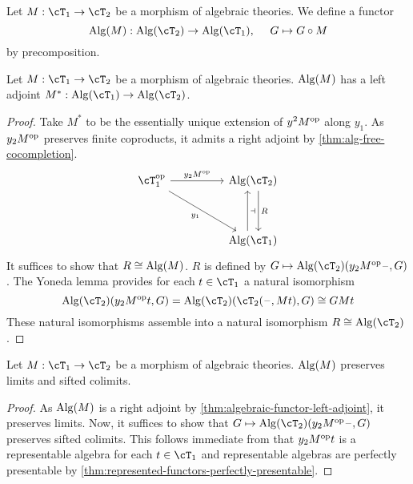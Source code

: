 \documentclass{zett}
\begin{document}
\begin{defn}
  Let $M : \cT_{1} \to \cT_{2}$ be a morphism of algebraic theories.
  We define a functor
  \[
    \Alg(M) : \Alg(\cT_{2}) \to \Alg(\cT_{1}),\quad~G \mapsto G \circ M
  \]
  by precomposition.
\end{defn}

\begin{thm}\label{thm:algebraic-functor-left-adjoint}
  Let $M : \cT_{1} \to \cT_{2}$ be a morphism of algebraic theories.
  $\operatorname{Alg}(M)$ has a left adjoint $M^{*} : \Alg(\cT_{1}) \to \Alg(\cT_{2})$.
\end{thm}
\begin{proof}
  Take $M^{*}$ to be the essentially unique extension of $y^{2}M^{\mathrm{op}}$ along $y_{1}$.
  As $y_{2}M^{\mathrm{op}}$ preserves finite coproducts, it admits a right adjoint by \cref{thm:alg-free-cocompletion}.
  \[\begin{tikzcd}
      {\cT_{1}\op} && {\Alg(\cT_{2})} \\
      \\
      && {\Alg(\cT_{1})}
      \arrow["{y_{2}M\op}", from=1-1, to=1-3]
      \arrow[""{name=0, anchor=center, inner sep=0}, "{R}", shift left=2, from=1-3, to=3-3]
      \arrow[""{name=1, anchor=center, inner sep=0}, shift left=2, from=3-3, to=1-3]
      \arrow["{y_{1}}"', from=1-1, to=3-3]
      \arrow["\dashv"{anchor=center}, draw=none, from=1, to=0]
    \end{tikzcd}\]
  It suffices to show that $R \cong \operatorname{Alg}(M)$.
  $R$ is defined by $G \mapsto \Alg(\cT_{2})(y_{2}M\op\blank, G)$.
  The Yoneda lemma provides for each $t \in \cT_{1}$ a natural isomorphism
  \[
    \Alg(\cT_{2})(y_{2}M\op t, G) = \Alg(\cT_{2})(\cT_{2}(\blank, Mt), G) \iso GMt
  \]
  These natural isomorphisms assemble into a natural isomorphism $R \iso \Alg(\cT_{2})$.
\end{proof}

\begin{cor}
  Let $M : \cT_{1} \to \cT_{2}$ be a morphism of algebraic theories.
  $\operatorname{Alg}(M)$ preserves limits and sifted colimits.
\end{cor}
\begin{proof}
  As $\operatorname{Alg}(M)$ is a right adjoint by \cref{thm:algebraic-functor-left-adjoint}, it preserves limits.
  Now, it suffices to show that $G \mapsto \Alg(\cT_{2})(y_{2}M\op\blank, G)$ preserves sifted colimits.
  This follows immediate from that $y_{2}M^{\mathrm{op}} t$ is a representable algebra for each $t \in \cT_{1}$ and representable algebras are perfectly presentable by \cref{thm:represented-functors-perfectly-presentable}.
\end{proof}
\end{document}
